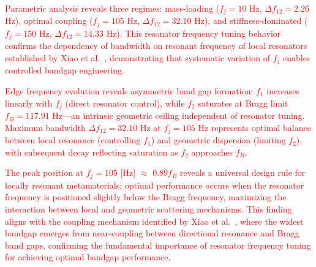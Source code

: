 \documentclass[review,numbers,sort&compress]{elsarticle}
\begin{document}
\textcolor{red}{Parametric analysis reveals three regimes: mass-loading ($f_j = 10$ Hz, $\Delta f_{12} = 2.26$ Hz), optimal coupling ($f_j = 105$ Hz, $\Delta f_{12} = 32.10$ Hz), and stiffness-dominated ($f_j = 150$ Hz, $\Delta f_{12} = 14.33$ Hz). This resonator frequency tuning behavior confirms the dependency of bandwidth on resonant frequency of local resonators established by Xiao et al.~\cite{Xiao_2012}, demonstrating that systematic variation of $f_j$ enables controlled bandgap engineering.}

\textcolor{red}{Edge frequency evolution reveals asymmetric band gap formation: $f_1$ increases linearly with $f_j$ (direct resonator control), while $f_2$ saturates at Bragg limit $f_B = 117.91$ Hz—an intrinsic geometric ceiling independent of resonator tuning. Maximum bandwidth $\Delta f_{12} = 32.10$ Hz at $f_j = 105$ Hz represents optimal balance between local resonance (controlling $f_1$) and geometric dispersion (limiting $f_2$), with subsequent decay reflecting saturation as $f_2$ approaches $f_B$.}

\textcolor{red}{The peak position at $f_j = 105$ [Hz] $\approx$ $0.89 f_B$ reveals a universal design rule for locally resonant metamaterials: optimal performance occurs when the resonator frequency is positioned slightly below the Bragg frequency, maximizing the interaction between local and geometric scattering mechanisms. This finding aligns with the coupling mechanism identified by Xiao et al.~\cite{Xiao_2012}, where the widest bandgap emerges from near-coupling between directional resonance and Bragg band gaps, confirming the fundamental importance of resonator frequency tuning for achieving optimal bandgap performance.} 
\end{document}

